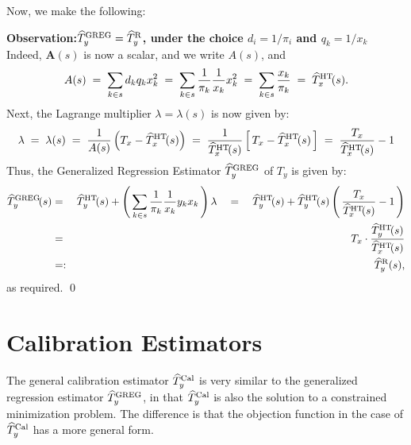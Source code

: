 \documentclass{article}
\begin{document}
\noindent
Now, we make the following:
\vskip 0.3cm
\begin{center}
\begin{minipage}{6.0in}
\noindent
\textbf{Observation:\quad$\widehat{T}^{\textnormal{GREG}}_{y} = \widehat{T}^{\textnormal{R}}_{y}$, under the choice $d_{i} = 1/\pi_{i}$ and $q_{k} = 1/x_{k}$}
\vskip 0.1cm
Indeed, $\mathbf{A}(s)$ is now a scalar, and we write $A(s)$, and
\begin{equation*}
A(s)
\;=\; \sum_{k \in s}d_{k}q_{k}x_{k}^{2}
\;=\; \sum_{k \in s}\dfrac{1}{\pi_{k}}\dfrac{1}{x_{k}}x_{k}^{2}
\;=\; \sum_{k \in s}\dfrac{x_{k}}{\pi_{k}}
\;=\; \widehat{T}^{\textnormal{HT}}_{x}\!(s).
\end{equation*}
Next, the Lagrange multiplier $\lambda = \lambda(s)$ is now given by:
\begin{equation*}
\lambda \; = \; \lambda(s)
\;=\; \dfrac{1}{A(s)}\left(T_{x} - \widehat{T}^{\textnormal{HT}}_{x}\!(s)\right)
\;=\; \dfrac{1}{\widehat{T}^{\textnormal{HT}}_{x}\!(s)}\left[\,T_{x} - \widehat{T}^{\textnormal{HT}}_{x}\!(s)\,\right]
\;=\; \dfrac{T_{x}}{\widehat{T}^{\textnormal{HT}}_{x}\!(s)} - 1
\end{equation*}
Thus, the Generalized Regression Estimator $\widehat{T}^{\textnormal{GREG}}_{y}$ of $T_{y}$ is given by:
\begin{eqnarray*}
\widehat{T}^{\textnormal{GREG}}_{y}\!(s)
&=& \widehat{T}^{\textnormal{HT}}_{y}\!(s) + \left(\,\sum_{k\in s}\dfrac{1}{\pi_{k}}\dfrac{1}{x_{k}}y_{k}x_{k}\,\right)\lambda
\quad=\quad \widehat{T}^{\textnormal{HT}}_{y}\!(s) + \widehat{T}^{\textnormal{HT}}_{y}\!(s)\left(\,\dfrac{T_{x}}{\widehat{T}^{\textnormal{HT}}_{x}\!(s)} - 1\,\right)\\
&=& T_{x}\cdot\dfrac{\widehat{T}^{\textnormal{HT}}_{y}\!(s)}{\widehat{T}^{\textnormal{HT}}_{x}\!(s)} \\
&=:& \widehat{T}^{\textnormal{R}}_{y}(s),
\end{eqnarray*}
as required. \qed
\end{minipage}
\end{center}


\section{Calibration Estimators}
\setcounter{theorem}{0}

The general calibration estimator $\widehat{T}^{\textnormal{Cal}}_{y}$ is very similar to the
generalized regression estimator $\widehat{T}^{\textnormal{GREG}}_{y}$, in that 
$\widehat{T}^{\textnormal{Cal}}_{y}$ is also the solution to a constrained minimization problem.
The difference is that the objection function in the case of $\widehat{T}^{\textnormal{Cal}}_{y}$
has a more general form.
\end{document}

